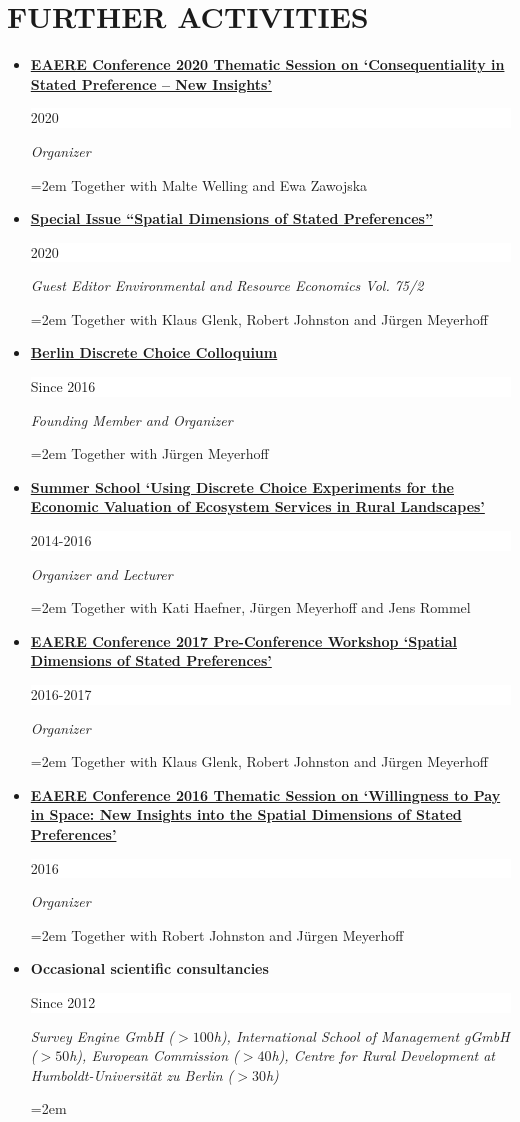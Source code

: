 \documentclass[paper=a4,fontsize=11pt]{scrartcl} %
\newcommand{\NewPart}[2]{\section*{\uppercase{#1} #2}}
\newcommand{\EducationEntry}[4]{
		\noindent \textbf{#1} \hfill      %
		\colorbox{White}{%
			\parbox{6em}{%
			\hfill\color{Black}#2}} \par  %
		\noindent \textit{#3} \par        %
		\noindent\hangindent=2em\hangafter=0 \small #4 %
		\normalsize \par}
\begin{document}
\NewPart{Further Activities}{}
\begin{itemize}






\item \EducationEntry{\href{http://fleximeets.com/eaere2020/?p=programme}{EAERE Conference 2020 Thematic Session on `Consequentiality in Stated Preference – New Insights'}}{2020}{Organizer}{Together with Malte Welling and Ewa Zawojska}

\item 
\EducationEntry{\href{https://link.springer.com/journal/10640/75/2}{Special Issue ``Spatial Dimensions of Stated Preferences''}}{2020}{Guest Editor Environmental and Resource Economics Vol. 75/2}{Together with Klaus Glenk, Robert Johnston and Jürgen Meyerhoff}

\item 
\EducationEntry{\href{http://www.landschaftsoekonomie.tu-berlin.de/menue/berlin_dce_colloquium/}{Berlin Discrete Choice Colloquium}}{Since 2016}{Founding Member and Organizer}{Together with Jürgen Meyerhoff}

\item \EducationEntry{\href{http://communications.ext.zalf.de/sites/dce/SitePages/DCE\%20Summer\%20School.aspx}{Summer School `Using Discrete Choice Experiments for the \newline Economic Valuation of Ecosystem Services in Rural Landscapes'}}{2014-2016}{Organizer and Lecturer}{Together with Kati Haefner, Jürgen Meyerhoff and Jens Rommel}

\item \EducationEntry{\href{http://www.eaere-conferences.org/index.php?p=60}{EAERE Conference 2017 Pre-Conference Workshop `Spatial \newline Dimensions of Stated Preferences'}}{2016-2017}{Organizer}{Together with Klaus Glenk, Robert Johnston and Jürgen Meyerhoff}


\item \EducationEntry{\href{https://eaere2016.ethz.ch/programme/scientific-programme/thematic-sessions.html}{EAERE Conference 2016 Thematic Session on `Willingness to Pay \newline in Space: New Insights into the Spatial Dimensions of Stated \newline Preferences'}}{2016}{Organizer}{Together with Robert Johnston and Jürgen Meyerhoff}

\item \EducationEntry{Occasional scientific consultancies}{Since 2012}{Survey Engine GmbH ($>100$h), International School of Management gGmbH ($>50$h), European Commission ($>40$h), Centre for Rural Development at Humboldt-Universität zu Berlin ($>30$h)}{}


\end{itemize}
\end{document}
